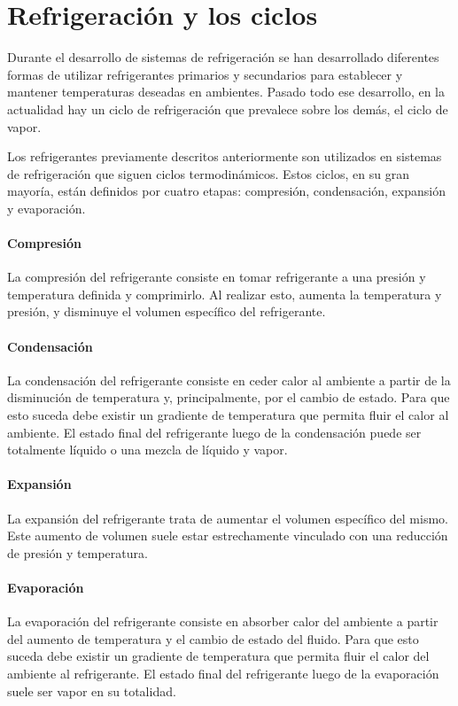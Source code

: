	\section{Refrigeración y los ciclos}
	
	Durante el desarrollo de sistemas de refrigeración se han desarrollado diferentes formas de utilizar refrigerantes primarios y secundarios para establecer y mantener temperaturas deseadas en ambientes. Pasado todo ese desarrollo, en la actualidad hay un ciclo de refrigeración que prevalece sobre los demás, el ciclo de vapor. 



	Los refrigerantes previamente descritos anteriormente son utilizados en sistemas de refrigeración que siguen ciclos termodinámicos. Estos ciclos, en su gran mayoría, están definidos por cuatro etapas: compresión, condensación, expansión y evaporación.

	\paragraph{Compresión} La compresión del refrigerante consiste en tomar refrigerante a una presión y temperatura definida y comprimirlo. Al realizar esto, aumenta la temperatura y presión, y disminuye el volumen específico del refrigerante. 

	\paragraph{Condensación} La condensación del refrigerante consiste en ceder calor al ambiente a partir de la disminución de temperatura y, principalmente, por el cambio de estado. Para que esto suceda debe existir un gradiente de temperatura que permita fluir el calor al ambiente. El estado final del refrigerante luego de la condensación puede ser totalmente líquido o una mezcla de líquido y vapor. 

	\paragraph{Expansión} La expansión del refrigerante trata de aumentar el volumen específico del mismo. Este aumento de volumen suele estar estrechamente vinculado con una reducción de presión y temperatura.

	\paragraph{Evaporación} La evaporación del refrigerante consiste en absorber calor del ambiente a partir del aumento de temperatura y el cambio de estado del fluido. Para que esto suceda debe existir un gradiente de temperatura que permita fluir el calor del ambiente al refrigerante. El estado final del refrigerante luego de la evaporación suele ser vapor en su totalidad. 

